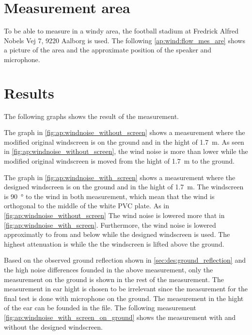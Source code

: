\section*{Measurement area}
To be able to measure in a windy area, the football stadium at Fredrick Alfred Nobels Vej 7, 9220 Aalborg is used. The following \autoref{ap:wind:flow_mes_are} shows a picture of the area and the approximate position of the speaker and microphone.


\section*{Results}

The following graphs shows the result of the measurement. 



The graph in \autoref{fig:ap:windnoise_without_screen} shows a measurement where the modified original windscreen is on the ground and in the hight of \SI{1.7}{\meter}. 
As seen in \autoref{fig:ap:windnoise_without_screen}, the wind noise is more than  lower while the modified original windscreen is moved from the hight of \SI{1.7}{\meter} to the ground. 



The graph in \autoref{fig:ap:windnoise_with_screen} shows a measurement where the designed windscreen is on the ground and in the hight of \SI{1.7}{\meter}. The windscreen is \SI{90}{\degree} to the wind in both measurement, which mean that the wind is orthogonal to the middle of the white PVC plate. 
As in \autoref{fig:ap:windnoise_without_screen} The wind noise is lowered more that   in \autoref{fig:ap:windnoise_with_screen}. Furthermore, the wind noise is lowered approximatly  to  from  and below while the designed windscreen is used. The highest attenuation is while the the windscreen is lifted above the ground.

Based on the observed ground reflection shown in \autoref{sec:des:ground_reflection} and the high noise differences founded in the above measurement, only the measurement on the ground is shown in the rest of the measurement. The measurement in ear hight is chosen to be irrelevant since the measurement for the final test is done with microphone on the ground. The measurement in the hight of the ear can be founded in the file. The following measurement \autoref{fig:ap:windnoise_with_screen_on_ground} shows the measurement with and without the designed windscreen. 


